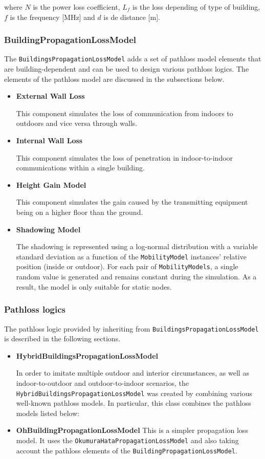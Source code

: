 where ${N}$ is the power loss coefficient, ${L_f}$ is the loss depending of type of building,
${f}$ is the frequency [MHz] and ${d}$ is de distance [m].

\subsubsection{BuildingPropagationLossModel}

The \texttt{BuildingsPropagationLossModel} adds a set of pathloss model elements that are 
building-dependent and can be used to design various pathloss logics. The elements of the 
pathloss model are discussed in the subsections below.

\begin{itemize}
  \item \textbf{External Wall Loss}

  This component simulates the loss of communication from indoors to outdoors and vice versa through walls.
  \item \textbf{Internal Wall Loss}

  This component simulates the loss of penetration in indoor-to-indoor communications within a single building.
  \item \textbf{Height Gain Model}

  This component simulates the gain caused by the transmitting equipment being on a higher floor than the ground.
  \item \textbf{Shadowing Model}

  The shadowing is represented using a log-normal distribution with a variable standard deviation
  as a function of the \texttt{MobilityModel} instances' relative position (inside or outdoor). For each 
  pair of \texttt{MobilityModels}, a single random value is generated and remains constant during the 
  simulation. As a result, the model is only suitable for static nodes.
\end{itemize}

\subsubsection{Pathloss logics}
The pathloss logic provided by inheriting from \texttt{BuildingsPropagationLossModel}
is described in the following sections.
\begin{itemize}
  \item \textbf{HybridBuildingsPropagationLossModel}

  In order to imitate multiple outdoor and interior circumstances, as well as indoor-to-outdoor 
  and outdoor-to-indoor scenarios, the \texttt{HybridBuildingsPropagationLossModel} was created by 
  combining various well-known pathloss models. In particular, this class combines the pathloss 
  models listed below:

  \item \textbf{OhBuildingPropagationLossModel}
  This is a simpler propagation loss model. It uses the \texttt{OkumuraHataPropagationLossModel} and 
  also taking account the pathloss elements of the \texttt{BuildingPropagationLossModel}.
\end{itemize}

